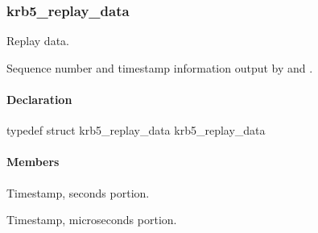 \documentclass[letterpaper,10pt,english]{sphinxmanual}
\begin{document}
\subsubsection{krb5\_replay\_data}
\label{appdev/refs/types/krb5_replay_data:krb5-replay-data}\label{appdev/refs/types/krb5_replay_data:krb5-replay-data-struct}\label{appdev/refs/types/krb5_replay_data::doc}

\begin{fulllineitems}
\label{appdev/refs/types/krb5_replay_data:krb5_replay_data}
\end{fulllineitems}


Replay data.

Sequence number and timestamp information output by {\hyperref[appdev/refs/api/krb5_rd_priv:krb5_rd_priv]{}} and {\hyperref[appdev/refs/api/krb5_rd_safe:krb5_rd_safe]{}} .


\paragraph{Declaration}
\label{appdev/refs/types/krb5_replay_data:declaration}
typedef struct krb5\_replay\_data  krb5\_replay\_data


\paragraph{Members}
\label{appdev/refs/types/krb5_replay_data:members}

\begin{fulllineitems}
\label{appdev/refs/types/krb5_replay_data:krb5_replay_data.timestamp}
Timestamp, seconds portion.

\end{fulllineitems}


\begin{fulllineitems}
\label{appdev/refs/types/krb5_replay_data:krb5_replay_data.usec}
Timestamp, microseconds portion.

\end{fulllineitems}
\end{document}
